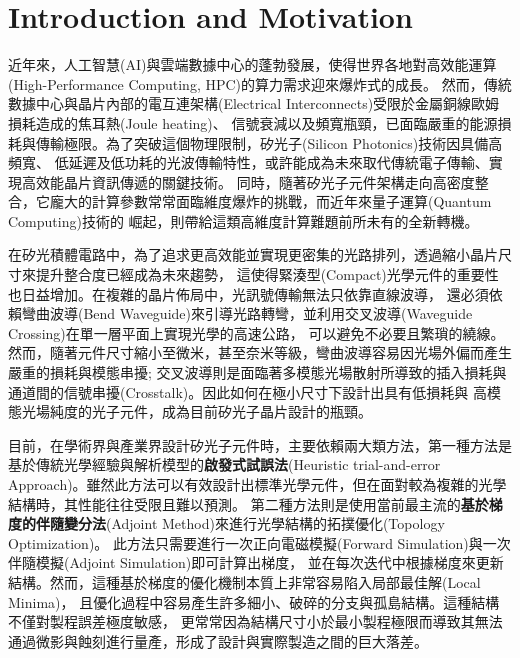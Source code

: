 \chapter{Introduction and Motivation}
\label{ch:intro}

近年來，人工智慧(AI)與雲端數據中心的蓬勃發展，使得世界各地對高效能運算(High-Performance Computing, HPC)的算力需求迎來爆炸式的成長。
然而，傳統數據中心與晶片內部的電互連架構(Electrical Interconnects)受限於金屬銅線歐姆損耗造成的焦耳熱(Joule heating)、
信號衰減以及頻寬瓶頸，已面臨嚴重的能源損耗與傳輸極限。為了突破這個物理限制，矽光子(Silicon Photonics)技術因具備高頻寬、
低延遲及低功耗的光波傳輸特性，或許能成為未來取代傳統電子傳輸、實現高效能晶片資訊傳遞的關鍵技術。
同時，隨著矽光子元件架構走向高密度整合，它龐大的計算參數常常面臨維度爆炸的挑戰，而近年來量子運算(Quantum Computing)技術的
崛起，則帶給這類高維度計算難題前所未有的全新轉機。

在矽光積體電路中，為了追求更高效能並實現更密集的光路排列，透過縮小晶片尺寸來提升整合度已經成為未來趨勢，
這使得緊湊型(Compact)光學元件的重要性也日益增加。在複雜的晶片佈局中，光訊號傳輸無法只依靠直線波導，
還必須依賴彎曲波導(Bend Waveguide)來引導光路轉彎，並利用交叉波導(Waveguide Crossing)在單一層平面上實現光學的高速公路，
可以避免不必要且繁瑣的繞線。然而，隨著元件尺寸縮小至微米，甚至奈米等級，彎曲波導容易因光場外偏而產生嚴重的損耗與模態串擾;
交叉波導則是面臨著多模態光場散射所導致的插入損耗與通道間的信號串擾(Crosstalk)。因此如何在極小尺寸下設計出具有低損耗與
高模態光場純度的光子元件，成為目前矽光子晶片設計的瓶頸。

目前，在學術界與產業界設計矽光子元件時，主要依賴兩大類方法，第一種方法是基於傳統光學經驗與解析模型的\textbf{啟發式試誤法}(Heuristic
 trial-and-error Approach)。雖然此方法可以有效設計出標準光學元件，但在面對較為複雜的光學結構時，其性能往往受限且難以預測。
第二種方法則是使用當前最主流的\textbf{基於梯度的伴隨變分法}(Adjoint Method)來進行光學結構的拓撲優化(Topology Optimization)。
此方法只需要進行一次正向電磁模擬(Forward Simulation)與一次伴隨模擬(Adjoint Simulation)即可計算出梯度，
並在每次迭代中根據梯度來更新結構。然而，這種基於梯度的優化機制本質上非常容易陷入局部最佳解(Local Minima)，
且優化過程中容易產生許多細小、破碎的分支與孤島結構。這種結構不僅對製程誤差極度敏感，
更常常因為結構尺寸小於最小製程極限而導致其無法通過微影與蝕刻進行量產，形成了設計與實際製造之間的巨大落差。

